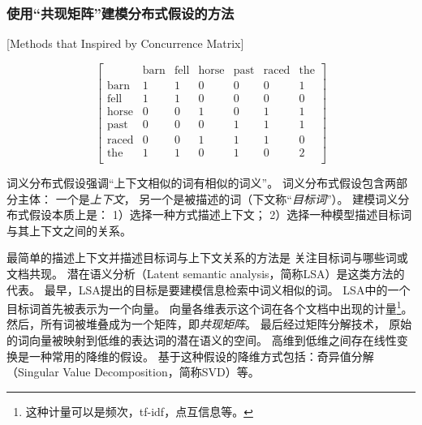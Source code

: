 \subsubsection{使用``共现矩阵''建模分布式假设的方法}[Methods that Inspired by Concurrence Matrix]\label{sec:intro:matrix}
\begin{figure}[t]
	\[
	\begin{bmatrix}
	 & \text{barn} & \text{fell} & \text{horse} & \text{past} & \text{raced} & \text{the} \\
	\text{barn} & 1 & 1 & 0  & 0 & 0 & 1 \\
	\text{fell} & 1 & 1 & 0  & 0 & 0 & 0 \\
	\text{horse} & 0 & 0 & 1  & 0 & 1 & 1 \\
	\text{past} & 0 & 0 & 0  & 1 & 1 & 1 \\
	\text{raced} & 0 & 0 & 1 & 1 & 1 & 0 \\
	\text{the} & 1 & 1 & 0  & 1 & 0 & 2 \\
	\end{bmatrix}
	\]
	\label{fig:1:example}
\end{figure}
词义分布式假设强调``上下文相似的词有相似的词义''。
词义分布式假设包含两部分主体：
一个是\textit{上下文}，
另一个是被描述的词（下文称``\textit{目标词}''）。
建模词义分布式假设本质上是：
1）选择一种方式描述上下文；
2）选择一种模型描述目标词与其上下文之间的关系。

最简单的描述上下文并描述目标词与上下文关系的方法是
关注目标词与哪些词或文档共现。
潜在语义分析（Latent semantic analysis，简称LSA）是这类方法的代表。
最早，LSA提出的目标是要建模信息检索中词义相似的词。
LSA中的一个目标词首先被表示为一个向量。
向量各维表示这个词在各个文档中出现的计量\footnote{这种计量可以是频次，tf-idf，点互信息等。}。
然后，所有词被堆叠成为一个矩阵，即\textit{共现矩阵}。
最后经过矩阵分解技术，
原始的词向量被映射到低维的表达词的潜在语义的空间。
高维到低维之间存在线性变换是一种常用的降维的假设。
基于这种假设的降维方式包括：奇异值分解（Singular Value Decomposition，简称SVD）等。

